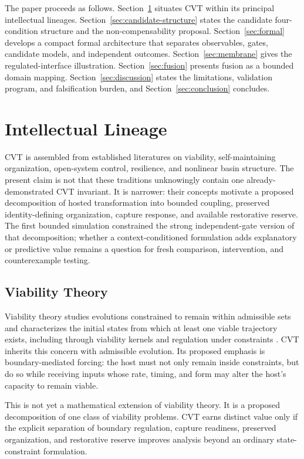 \documentclass[11pt]{article}
\begin{document}
The paper proceeds as follows. Section~\ref{sec:lineage} situates CVT within its principal intellectual lineages. Section~\ref{sec:candidate-structure} states the candidate four-condition structure and the non-compensability proposal. Section~\ref{sec:formal} develops a compact formal architecture that separates observables, gates, candidate models, and independent outcomes. Section~\ref{sec:membrane} gives the regulated-interface illustration. Section~\ref{sec:fusion} presents fusion as a bounded domain mapping. Section~\ref{sec:discussion} states the limitations, validation program, and falsification burden, and Section~\ref{sec:conclusion} concludes.

\section{Intellectual Lineage}
\label{sec:lineage}

CVT is assembled from established literatures on viability, self-maintaining organization, open-system control, resilience, and nonlinear basin structure. The present claim is not that these traditions unknowingly contain one already-demonstrated CVT invariant. It is narrower: their concepts motivate a proposed decomposition of hosted transformation into bounded coupling, preserved identity-defining organization, capture response, and available restorative reserve. The first bounded simulation constrained the strong independent-gate version of that decomposition; whether a context-conditioned formulation adds explanatory or predictive value remains a question for fresh comparison, intervention, and counterexample testing.

\subsection{Viability Theory}

Viability theory studies evolutions constrained to remain within admissible sets and characterizes the initial states from which at least one viable trajectory exists, including through viability kernels and regulation under constraints \cite{aubin2011}. CVT inherits this concern with admissible evolution. Its proposed emphasis is boundary-mediated forcing: the host must not only remain inside constraints, but do so while receiving inputs whose rate, timing, and form may alter the host's capacity to remain viable.

This is not yet a mathematical extension of viability theory. It is a proposed decomposition of one class of viability problems. CVT earns distinct value only if the explicit separation of boundary regulation, capture readiness, preserved organization, and restorative reserve improves analysis beyond an ordinary state-constraint formulation.
\end{document}
